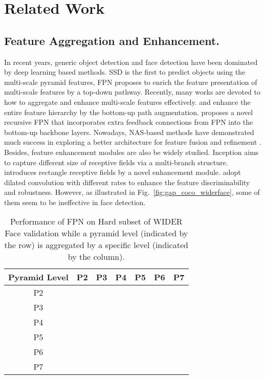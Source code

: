 \documentclass[sigconf]{acmart}
\begin{document}
\section{Related Work}
\subsection{Feature Aggregation and Enhancement.}
In recent years, generic object detection and face detection have been dominated by deep learning based methods. SSD \cite{liu2016ssd} is the first to predict objects using the multi-scale pyramid features, FPN \cite{lin2017fpn} proposes to enrich the feature presentation of multi-scale features by a top-down pathway. Recently, many works are devoted to how to aggregate and enhance multi-scale features effectively. \cite{liu2018pafpn} and \cite{tan2020efficientdet} enhance the entire feature hierarchy by the bottom-up path augmentation. \cite{qiao2020detectors} proposes a novel recursive FPN that incorporates extra feedback connections from FPN into the bottom-up backbone layers. 
Nowadays, NAS-based methods have demonstrated much success in exploring a better architecture for feature fusion and refinement \cite{xu2019autofpn,wang2019nasfcos,ghiasi2019nasfpn}.
Besides, feature enhancement modules are also be widely studied. Inception \cite{szegedy2017inception,szegedy2016rethinking} aims to capture different size of receptive fields via a multi-branch structure. \cite{zhang2020refineface} introduces rectangle receptive fields by a novel enhancement module. \cite{qiao2020detectors,li2019dsfd,liu2018rfb} adopt dilated convolution with different rates to enhance the feature discriminability and robustness. However, as illustrated in Fig.~\ref{fig:gap_coco_widerface}, some of them seem to be ineffective in face detection.


\begin{table}[!t]
    \centering
    \begin{tabular}{c|cccccc}
        \toprule[1pt]
        Pyramid Level & P2 & P3 & P4 & P5 & P6 & P7 \\
        \midrule[0.5pt]
        P2 &  & \textcolor{red}{} &  &  &  &  \\
        P3 & \textcolor{blue}{} &  & \textcolor{red}{} &  &  &  \\
        P4 &  & \textcolor{blue}{} &  & \textcolor{red}{} &  & \\
        P5 &  &  & \textcolor{blue}{} &  & \textcolor{red}{} &  \\
        P6 &  &  &  & \textcolor{blue}{} &  & \textcolor{red}{} \\
        P7 &  &  &  &  & \textcolor{blue}{} &  \\
        \bottomrule[1pt]
    \end{tabular}
\caption{ Performance of FPN on Hard subset of WIDER Face validation while a pyramid level (indicated by the row) is aggregated by a specific level (indicated by the column).}
    \label{tab:pyramid_fa}
\end{table}
\end{document}

